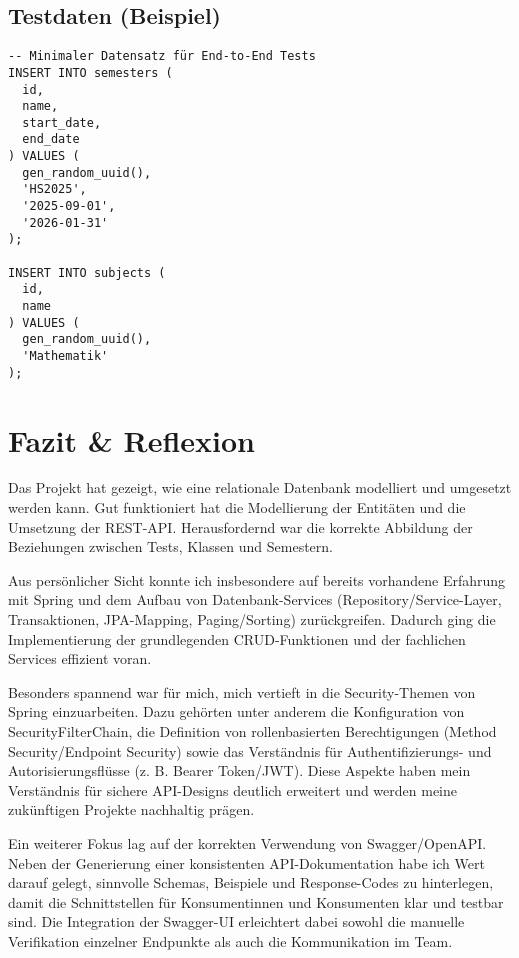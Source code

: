 \documentclass[12pt,a4paper]{article}
\begin{document}
    \subsection{Testdaten (Beispiel)}
    \begin{lstlisting}
-- Minimaler Datensatz für End-to-End Tests
INSERT INTO semesters (
  id,
  name,
  start_date,
  end_date
) VALUES (
  gen_random_uuid(),
  'HS2025',
  '2025-09-01',
  '2026-01-31'
);

INSERT INTO subjects (
  id,
  name
) VALUES (
  gen_random_uuid(),
  'Mathematik'
);
    \end{lstlisting}

    \section{Fazit \& Reflexion}
    Das Projekt hat gezeigt, wie eine relationale Datenbank modelliert und umgesetzt werden kann.
    Gut funktioniert hat die Modellierung der Entitäten und die Umsetzung der REST-API.
    Herausfordernd war die korrekte Abbildung der Beziehungen zwischen Tests, Klassen und Semestern.

    Aus persönlicher Sicht konnte ich insbesondere auf bereits vorhandene Erfahrung mit Spring und
    dem Aufbau von Datenbank-Services (Repository/Service-Layer, Transaktionen, JPA-Mapping,
    Paging/Sorting) zurückgreifen. Dadurch ging die Implementierung der grundlegenden CRUD-Funktionen
    und der fachlichen Services effizient voran.

    Besonders spannend war für mich, mich vertieft in die Security-Themen von Spring einzuarbeiten.
    Dazu gehörten unter anderem die Konfiguration von SecurityFilterChain, die Definition von
    rollenbasierten Berechtigungen (Method Security/Endpoint Security) sowie das Verständnis für
    Authentifizierungs- und Autorisierungsflüsse (z. B. Bearer Token/JWT). Diese Aspekte haben mein
    Verständnis für sichere API-Designs deutlich erweitert und werden meine zukünftigen Projekte
    nachhaltig prägen.

    Ein weiterer Fokus lag auf der korrekten Verwendung von Swagger/OpenAPI. Neben der Generierung
    einer konsistenten API-Dokumentation habe ich Wert darauf gelegt, sinnvolle Schemas, Beispiele
    und Response-Codes zu hinterlegen, damit die Schnittstellen für Konsumentinnen und Konsumenten
    klar und testbar sind. Die Integration der Swagger-UI erleichtert dabei sowohl die manuelle
    Verifikation einzelner Endpunkte als auch die Kommunikation im Team.
\end{document}
